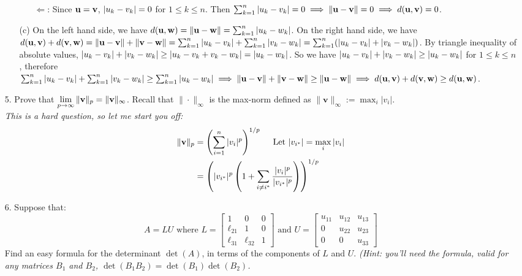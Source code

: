 \documentclass{article}
\newcommand{\bu}{{\bf u}}
\newcommand{\bv}{{\bf v}}
\newcommand{\bw}{{\bf w}}
\begin{document}
\begin{itemize}
\begin{itemize}
\begin{itemize}
                        \item [$\Leftarrow$:] Since $\bu=\bv$, $\abs{u_k-v_k}=0$ for $1\leq k\leq n$. Then $\sum_{k=1}^n\abs{u_k-v_k}=0\implies\|\bu-\bv\|=0\implies d(\bu,\bv)=0$.
                    \end{itemize}
              \item [(c)] On the left hand side, we have $d(\bu,\bw)=\|\bu-\bw\|=\sum_{k=1}^n\abs{u_k-w_k}$. On the right hand side, we have $d(\bu,\bv)+d(\bv,\bw)=\|\bu-\bv\|+\|\bv-\bw\|=\sum_{k=1}^n\abs{u_k-v_k}+\sum_{k=1}^n\abs{v_k-w_k}=\sum_{k=1}^n(\abs{u_k-v_k}+\abs{v_k-w_k})$. By triangle inequality of absolute values, $\abs{u_k-v_k}+\abs{v_k-w_k}\geq\abs{u_k-v_k+v_k-w_k}=\abs{u_k-w_k}$. So we have $\abs{u_k-v_k}+\abs{v_k-w_k}\geq\abs{u_k-w_k}$ for $1\leq k\leq n$, therefore $\sum_{k=1}^n\abs{u_k-v_k}+\sum_{k=1}^n\abs{v_k-w_k}\geq\sum_{k=1}^n\abs{u_k-w_k}\implies\|\bu-\bv\|+\|\bv-\bw\|\geq\|\bu-\bw\|\implies d(\bu,\bv)+d(\bv,\bw)\geq d(\bu,\bw)$.
          \end{itemize}
    \item [5.] Prove that $\displaystyle \lim_{p\to\infty} \|\bv\|_{p} = \|\mathbf{v}\|_{\infty}$. Recall that $\|\cdot\|_{\infty}$ is the max-norm defined as $\|\mathbf{v}\|_{\infty} := \max_{i} |v_i|$. \\
          {\em This is a hard question, so let me start you off:}
          \begin{align*}
              \|\bv\|_{p} & = \left(\sum_{i=1}^{n}|v_i|^{p}\right)^{1/p} \quad \text{ Let } |v_{i^{*}}| = \max_{i} |v_i|              \\
                          & = \left(|v_{i^{*}}|^{p}\left( 1 + \sum_{i\neq i^{*}}\frac{|v_i|^{p}}{|v_{i^{*}}|^{p}}\right)\right)^{1/p}
          \end{align*}
    \item [6.] Suppose that: $$A = LU \text{ where } L  = \left[\begin{matrix} 1 & 0 & 0 \\ \ell_{21} & 1 & 0 \\ \ell_{31} & \ell_{32} & 1 \end{matrix}\right] \text{ and } U = \left[\begin{matrix} u_{11} & u_{12} & u_{13} \\ 0 & u_{22} & u_{23} \\ 0 & 0 & u_{33} \end{matrix}\right]$$ Find an easy formula for the determinant $\det(A)$, in terms of the components of $L$ and $U$. {\em (Hint: you'll need the formula, valid for any matrices $B_1$ and $B_2$, $\det(B_1B_2) = \det(B_1)\det(B_2)$.}\\

\end{itemize}
\end{document}
